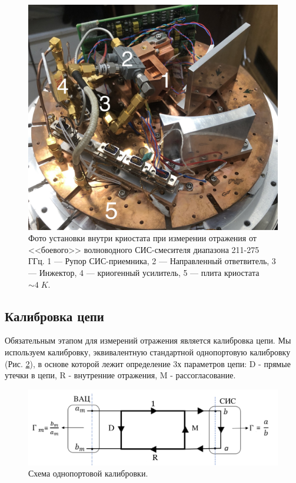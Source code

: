 \documentclass[a4paper]{article}
\begin{document}
\begin{figure}[H]
    \begin{center}
        \includegraphics[scale=0.1]{exp_photo.jpg}
        \caption{Фото установки внутри криостата при измерении отражения от <<боевого>> волноводного СИС-смесителя диапазона 211-275 ГГц. 1 — Рупор СИС-приемника, 2 — Направленный ответвитель, 3 — Инжектор, 4 — криогенный усилитель, 5 — плита криостата $\sim 4\; K$.}
        \label{fig:exp_photo}
    \end{center}
\end{figure}


\subsection{Калибровка цепи}

Обязательным этапом для измерений отражения является калибровка цепи. Мы используем калибровку, эквивалентную стандартной однопортовую калибровку (Рис. \ref{pic-error}), 
в основе которой лежит определение 3х параметров цепи: D - прямые утечки в цепи, R - внутренние отражения, M - рассогласование. 

\begin{figure}[H]
    \begin{center}
        \includegraphics[scale=0.4]{Error.png}
        \caption{Схема однопортовой калибровки.}
        \label{pic-error}
    \end{center}
\end{figure}
\end{document}
